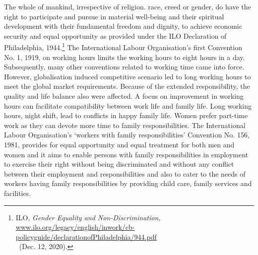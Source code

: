 \begin{multicols}{2}

\vspace{-.1cm}

\noi
The whole of mankind, irrespective of religion. race, creed or gender, do have the right to
participate and pursue in material well-being and their spiritual development with their
fundamental freedom and dignity, to achieve economic security and equal opportunity as
provided under the ILO Declaration of Philadelphia, 1944.\footnote{ILO, \textit{Gender Equality and Non-Discrimination,}\\ \url{www.ilo.org/legacy/english/inwork/cb-policyguide/declarationofPhiladelphia/944.pdf}\\~(Dec. 12, 2020).} The International Labour
Organisation’s first Convention No. 1, 1919, on working hours limits the working hours to
eight hours in a day. Subsequently, many other conventions related to working time came
into force. However, globalisation induced competitive scenario led to long working hours to
meet the global market requirements. Because of the extended responsibility, the quality and
life balance also were affected. A focus on improvement in working hours can facilitate
compatibility between work life and family life. Long working hours, night shift, lead to
conflicts in happy family life. Women prefer part-time work as they can devote more time to
family responsibilities. The International Labour Organisation’s ‘workers with family
responsibilities’ Convention No. 156, 1981, provides for equal opportunity and equal
treatment for both men and women and it aims to enable persons with family responsibilities
in employment to exercise their right without being discriminated and without any conflict 
between their employment and responsibilities and also to cater to the needs of workers
having family responsibilities by providing child care, family services and facilities.


\end{multicols}
